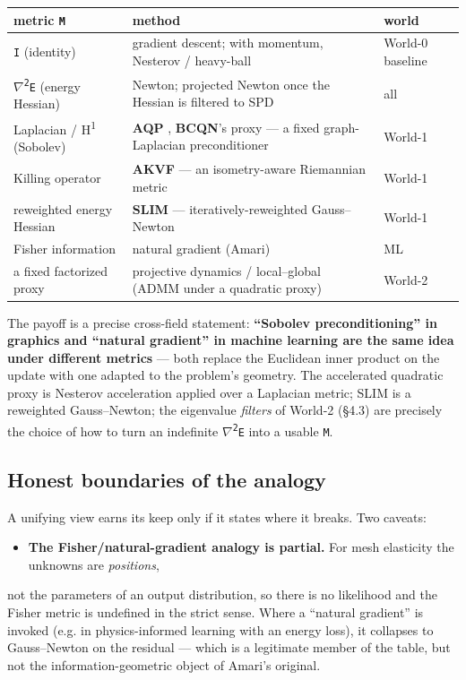 \documentclass{egpubl}
\begin{document}
\begin{table}[t]\centering\footnotesize\begin{tabular}{lll}
\toprule metric \texttt{M} & method & world \\ \midrule
\texttt{I} (identity) & gradient descent; with momentum, Nesterov / heavy-ball \cite{nesterov-1983} & World-0 baseline \\
\texttt{$\nabla$\textsuperscript{2}E} (energy Hessian) & Newton; projected Newton once the Hessian is filtered to SPD & all \\
Laplacian / H\textsuperscript{1} (Sobolev) & \textbf{AQP} \cite{aqp}, \textbf{BCQN}'s proxy \cite{bcqn} --- a fixed graph-Laplacian preconditioner & World-1 \\
Killing operator & \textbf{AKVF} \cite{akvf} --- an isometry-aware Riemannian metric & World-1 \\
reweighted energy Hessian & \textbf{SLIM} \cite{slim} --- iteratively-reweighted Gauss--Newton & World-1 \\
Fisher information & natural gradient (Amari) \cite{amari-1998} & ML \\
a fixed factorized proxy & projective dynamics \cite{projective-dynamics} / local--global \cite{local-global} (ADMM \cite{boyd-2011-admm} under a quadratic proxy) & World-2 \\
\bottomrule\end{tabular}\end{table}

The payoff is a precise cross-field statement: \textbf{``Sobolev preconditioning'' in graphics and ``natural
gradient'' in machine learning are the same idea under different metrics} --- both replace the Euclidean
inner product on the update with one adapted to the problem's geometry. The accelerated quadratic
proxy is Nesterov acceleration applied over a Laplacian metric; SLIM is a reweighted Gauss--Newton; the
eigenvalue \emph{filters} of World-2 (\S4.3) are precisely the choice of how to turn an indefinite \texttt{$\nabla$\textsuperscript{2}E}
into a usable \texttt{M}.

\subsection{Honest boundaries of the analogy}

A unifying view earns its keep only if it states where it breaks. Two caveats:

\begin{itemize}
  \item \textbf{The Fisher/natural-gradient analogy is partial.} For mesh elasticity the unknowns are \emph{positions},
\end{itemize}
  not the parameters of an output distribution, so there is no likelihood and the Fisher metric is
  undefined in the strict sense. Where a ``natural gradient'' is invoked (e.g. in physics-informed
  learning with an energy loss), it collapses to Gauss--Newton on the residual --- which is a legitimate
  member of the table, but not the information-geometric object of Amari's original.
\end{document}
